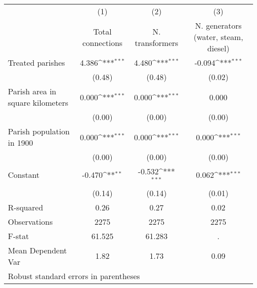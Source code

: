 {
\def\sym#1{\ifmmode^{#1}\else\(^{#1}\)\fi}
\begin{tabular}{l*{3}{c}}
\hline\hline
                    &\multicolumn{1}{c}{(1)}         &\multicolumn{1}{c}{(2)}         &\multicolumn{1}{c}{(3)}         \\
                    &Total connections         &N. transformers         &N. generators (water, steam, diesel)         \\
\hline
Treated parishes    &       4.386\sym{***}&       4.480\sym{***}&      -0.094\sym{***}\\
                    &      (0.48)         &      (0.48)         &      (0.02)         \\
Parish area in square kilometers&       0.000\sym{***}&       0.000\sym{***}&       0.000         \\
                    &      (0.00)         &      (0.00)         &      (0.00)         \\
Parish population in 1900&       0.000\sym{***}&       0.000\sym{***}&       0.000\sym{***}\\
                    &      (0.00)         &      (0.00)         &      (0.00)         \\
Constant            &      -0.470\sym{**} &      -0.532\sym{***}&       0.062\sym{***}\\
                    &      (0.14)         &      (0.14)         &      (0.01)         \\
\hline
R-squared           &        0.26         &        0.27         &        0.02         \\
Observations        &        2275         &        2275         &        2275         \\
F-stat              &      61.525         &      61.283         &           .         \\
Mean Dependent Var  &        1.82         &        1.73         &        0.09         \\
\hline\hline
\multicolumn{4}{l}{\footnotesize Robust standard errors in parentheses}\\
\end{tabular}
}
